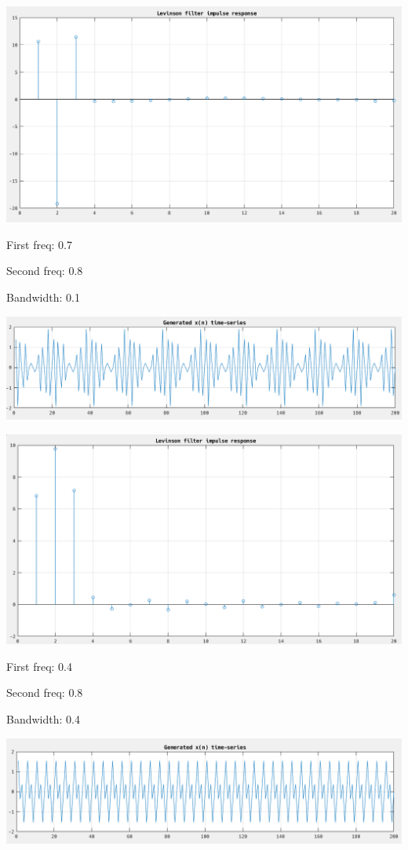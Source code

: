 \documentclass[12pt]{article}
\begin{document}
\includegraphics[width=\textwidth]{6.png}

First freq: 0.7

Second freq: 0.8

Bandwidth: 0.1

\includegraphics[width=\textwidth]{7.png}

\includegraphics[width=\textwidth]{8.png}

First freq: 0.4

Second freq: 0.8

Bandwidth: 0.4

\includegraphics[width=\textwidth]{9.png}
\end{document}
